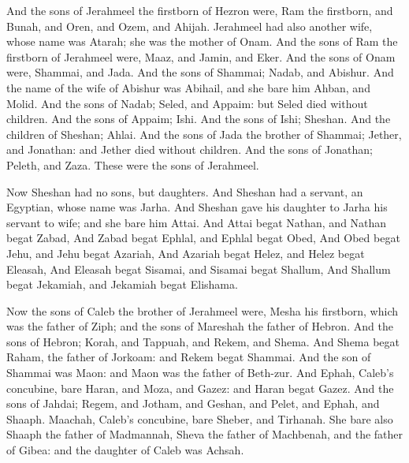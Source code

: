  And the sons of Jerahmeel the firstborn of Hezron were,
Ram the firstborn, and Bunah, and Oren, and Ozem, and Ahijah.
 Jerahmeel had also another wife, whose name was Atarah;
she was the mother of Onam.  And the sons of Ram the
firstborn of Jerahmeel were, Maaz, and Jamin, and Eker. 
And the sons of Onam were, Shammai, and Jada. And the sons of Shammai;
Nadab, and Abishur.  And the name of the wife of Abishur
was Abihail, and she bare him Ahban, and Molid.  And the
sons of Nadab; Seled, and Appaim: but Seled died without children.
 And the sons of Appaim; Ishi. And the sons of Ishi;
Sheshan. And the children of Sheshan; Ahlai.  And the sons
of Jada the brother of Shammai; Jether, and Jonathan: and Jether died
without children.  And the sons of Jonathan; Peleth, and
Zaza. These were the sons of Jerahmeel.

 Now Sheshan had no sons, but daughters. And Sheshan had
a servant, an Egyptian, whose name was Jarha.  And Sheshan
gave his daughter to Jarha his servant to wife; and she bare him Attai.
 And Attai begat Nathan, and Nathan begat Zabad,
 And Zabad begat Ephlal, and Ephlal begat Obed,
 And Obed begat Jehu, and Jehu begat Azariah, 
And Azariah begat Helez, and Helez begat Eleasah,  And
Eleasah begat Sisamai, and Sisamai begat Shallum,  And
Shallum begat Jekamiah, and Jekamiah begat Elishama.

 Now the sons of Caleb the brother of Jerahmeel were,
Mesha his firstborn, which was the father of Ziph; and the sons of
Mareshah the father of Hebron.  And the sons of Hebron;
Korah, and Tappuah, and Rekem, and Shema.  And Shema begat
Raham, the father of Jorkoam: and Rekem begat Shammai.  And
the son of Shammai was Maon: and Maon was the father of Beth-zur.
 And Ephah, Caleb's concubine, bare Haran, and Moza, and
Gazez: and Haran begat Gazez.  And the sons of Jahdai;
Regem, and Jotham, and Geshan, and Pelet, and Ephah, and Shaaph.
 Maachah, Caleb's concubine, bare Sheber, and Tirhanah.
 She bare also Shaaph the father of Madmannah, Sheva the
father of Machbenah, and the father of Gibea: and the daughter of Caleb
was Achsah.

